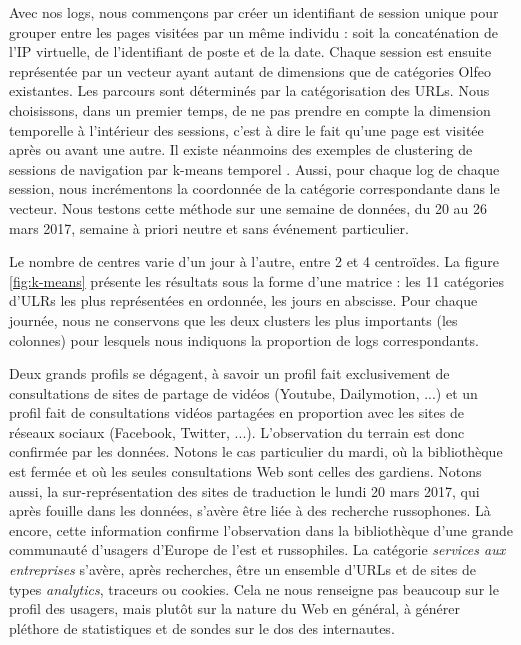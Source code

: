 \documentclass[symmetric,justified,marginals=raggedouter]{tufte-book}
\begin{document}
Avec nos logs, nous commençons par créer un identifiant de session unique pour grouper entre les pages visitées par un même individu : soit la concaténation de l'IP virtuelle, de l'identifiant de poste et de la date. Chaque session est ensuite représentée par un vecteur ayant autant de dimensions que de catégories Olfeo existantes. Les parcours sont déterminés par la catégorisation des URLs. Nous choisissons, dans un premier temps, de ne pas prendre en compte la dimension temporelle à l'intérieur des sessions, c'est à dire le fait qu'une page est visitée après ou avant une autre. Il existe néanmoins des exemples de clustering de sessions de navigation par k-means temporel \citep{stevanovic_unsupervised_2011}. Aussi, pour chaque log de chaque session, nous incrémentons la coordonnée de la catégorie correspondante dans le vecteur. Nous testons cette méthode sur une semaine de données, du 20 au 26 mars 2017, semaine à priori neutre et sans événement particulier. 

Le nombre de centres varie d'un jour à l'autre, entre 2 et 4 centroïdes. La figure \ref{fig:k-means} présente les résultats sous la forme d'une matrice : les 11 catégories d'ULRs les plus représentées en ordonnée, les jours en abscisse. Pour chaque journée, nous ne conservons que les deux clusters les plus importants (les colonnes) pour lesquels nous indiquons la proportion de logs correspondants. 

Deux grands profils se dégagent, à savoir un profil fait exclusivement de consultations de sites de partage de vidéos (Youtube, Dailymotion, ...) et un profil fait de consultations vidéos partagées en proportion avec les sites de réseaux sociaux (Facebook, Twitter, ...). L'observation du terrain est donc confirmée par les données. Notons le cas particulier du mardi, où la bibliothèque est fermée et où les seules consultations Web sont celles des gardiens. Notons aussi, la sur-représentation des sites de traduction le lundi 20 mars 2017, qui après fouille dans les données, s'avère être liée à des recherche russophones. Là encore, cette information confirme l'observation dans la bibliothèque d'une grande communauté d'usagers d'Europe de l'est et russophiles. La catégorie \textit{services aux entreprises} s'avère, après recherches, être un ensemble d'URLs et de sites de types \textit{analytics}, traceurs ou cookies. Cela ne nous renseigne pas beaucoup sur le profil des usagers, mais plutôt sur la nature du Web en général, à générer pléthore de statistiques et de sondes sur le dos des internautes.
\end{document}
